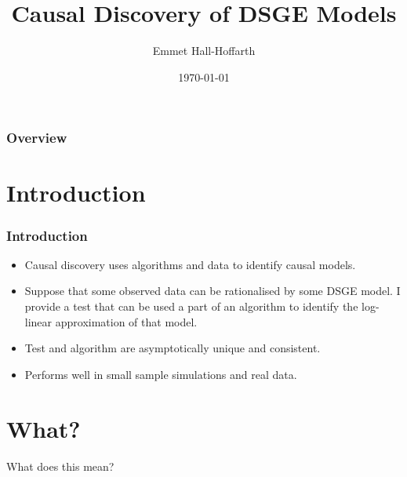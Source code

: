 \documentclass{beamer}
\title[Causal Discovery DSGE]{Causal Discovery of DSGE Models} %
\author{Emmet Hall-Hoffarth} %
\institute[Oxford] %
{
University of Oxford \\ %
\medskip
\textit{emmet.hall-hoffarth@economics.ox.ac.uk} %
}
\date{\today} %
\begin{document}
\begin{frame}
    \titlepage %
\end{frame}

\begin{frame}
    \frametitle{Overview} %
    \tableofcontents %
\end{frame}

\section{Introduction}

\begin{frame}
    \frametitle{Introduction}
    \begin{itemize}
        \item Causal discovery uses algorithms and data to identify causal models.
        \item Suppose that some observed data can be rationalised by some DSGE model. I provide a test that can be used a part of an algorithm to identify the log-linear approximation of that model.
        \item Test and algorithm are asymptotically unique and consistent.
        \item Performs well in small sample simulations and real data.
    \end{itemize}
\end{frame}

\section{What?}

\begin{frame}
    \centering
    \huge
    What does this mean?
\end{frame}
\end{document}
